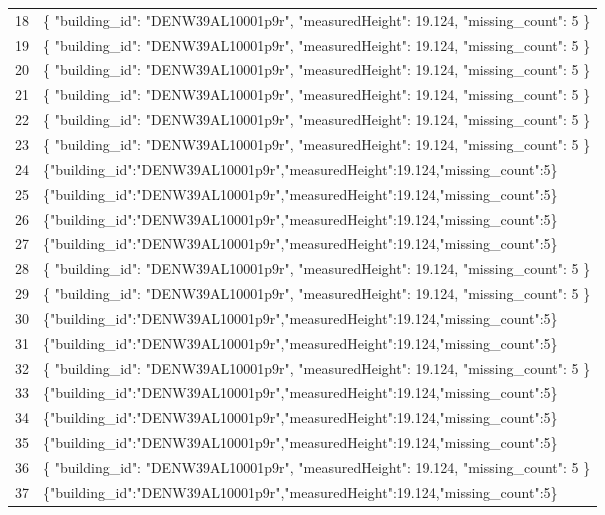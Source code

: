 \documentclass[a4paper,11pt]{article}
\begin{document}
\begin{table}[ht]
\begin{tabular}{r p{12cm}}
18 & \{
  "building\_id": "DENW39AL10001p9r",
  "measuredHeight": 19.124,
  "missing\_count": 5
\} \\
19 & \{
  "building\_id": "DENW39AL10001p9r",
  "measuredHeight": 19.124,
  "missing\_count": 5
\} \\
20 & \{
  "building\_id": "DENW39AL10001p9r",
  "measuredHeight": 19.124,
  "missing\_count": 5
\} \\
21 & \{
  "building\_id": "DENW39AL10001p9r",
  "measuredHeight": 19.124,
  "missing\_count": 5
\} \\
22 & \{
  "building\_id": "DENW39AL10001p9r",
  "measuredHeight": 19.124,
  "missing\_count": 5
\} \\
23 & \{
  "building\_id": "DENW39AL10001p9r",
  "measuredHeight": 19.124,
  "missing\_count": 5
\} \\
24 & \{"building\_id":"DENW39AL10001p9r","measuredHeight":19.124,"missing\_count":5\} \\
25 & \{"building\_id":"DENW39AL10001p9r","measuredHeight":19.124,"missing\_count":5\} \\
26 & \{"building\_id":"DENW39AL10001p9r","measuredHeight":19.124,"missing\_count":5\} \\
27 & \{"building\_id":"DENW39AL10001p9r","measuredHeight":19.124,"missing\_count":5\} \\
28 & \{
  "building\_id": "DENW39AL10001p9r",
  "measuredHeight": 19.124,
  "missing\_count": 5
\} \\
29 & \{
  "building\_id": "DENW39AL10001p9r",
  "measuredHeight": 19.124,
  "missing\_count": 5
\} \\
30 & \{"building\_id":"DENW39AL10001p9r","measuredHeight":19.124,"missing\_count":5\} \\
31 & \{"building\_id":"DENW39AL10001p9r","measuredHeight":19.124,"missing\_count":5\} \\
32 & \{
  "building\_id": "DENW39AL10001p9r",
  "measuredHeight": 19.124,
  "missing\_count": 5
\} \\
33 & \{"building\_id":"DENW39AL10001p9r","measuredHeight":19.124,"missing\_count":5\} \\
34 & \{"building\_id":"DENW39AL10001p9r","measuredHeight":19.124,"missing\_count":5\} \\
35 & \{"building\_id":"DENW39AL10001p9r","measuredHeight":19.124,"missing\_count":5\} \\
36 & \{
  "building\_id": "DENW39AL10001p9r",
  "measuredHeight": 19.124,
  "missing\_count": 5
\} \\
37 & \{"building\_id":"DENW39AL10001p9r","measuredHeight":19.124,"missing\_count":5\} \\

\end{tabular}
\end{table}
\end{document}
